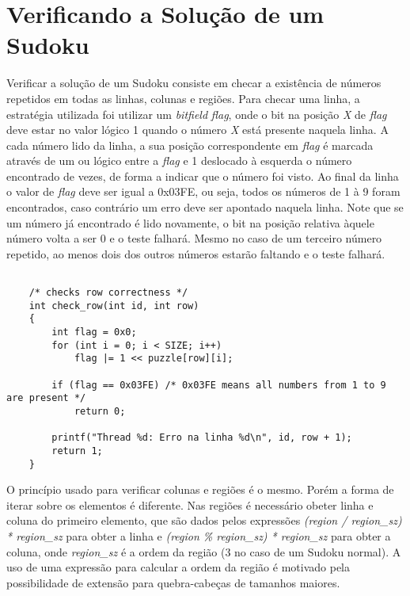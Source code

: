 \documentclass[a4paper, 12pt]{article}
\begin{document}
\section{Verificando a Solução de um Sudoku}

Verificar a solução de um Sudoku consiste em checar a existência de números
repetidos em todas as linhas, colunas e regiões. Para checar uma linha,
a estratégia utilizada foi utilizar um \textit{bitfield} \textit{flag}, onde o 
bit na posição \textit{X} de \textit{flag} deve estar no valor lógico 1 quando 
o número \textit{X} está presente naquela linha.
A cada número lido da linha, a sua posição correspondente em \textit{flag} é
marcada através de um ou lógico entre a \textit{flag} e 1 deslocado à esquerda
o número encontrado de vezes, de forma a indicar que o número foi visto.
Ao final da linha o valor de \textit{flag} deve ser igual a 0x03FE, ou seja, 
todos os números de 1 à 9 foram encontrados, caso contrário um erro deve ser
apontado naquela linha. Note que se um número já encontrado é lido novamente, o 
bit na posição relativa àquele número volta a ser 0 e o teste falhará. Mesmo no 
caso de um terceiro número repetido, ao menos dois dos outros números estarão 
faltando e o teste falhará.

\begin{verbatim}

    /* checks row correctness */
    int check_row(int id, int row)
    {
        int flag = 0x0;
        for (int i = 0; i < SIZE; i++)
            flag |= 1 << puzzle[row][i];

        if (flag == 0x03FE) /* 0x03FE means all numbers from 1 to 9 are present */
            return 0;

        printf("Thread %d: Erro na linha %d\n", id, row + 1);
        return 1;
    }

\end{verbatim}


O princípio usado para verificar colunas e regiões é o mesmo. Porém a forma de 
iterar sobre os elementos é diferente. Nas regiões é necessário obeter linha e 
coluna do primeiro elemento, que são dados pelos expressões 
\textit{(region / region\_sz) * region\_sz} para obter a linha e
\textit{(region \% region\_sz) * region\_sz} para obter a coluna, onde 
\textit{region_sz} é a ordem da região (3 no caso de um Sudoku normal). A uso 
de uma expressão para calcular a ordem da região é motivado pela possibilidade 
de extensão para quebra-cabeças de tamanhos maiores.
\end{document}
